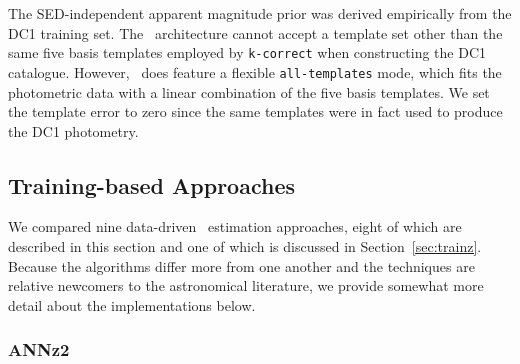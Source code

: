 The SED-independent apparent magnitude prior was derived empirically from the DC1 training set.
The \eazy\ architecture cannot accept a template set other than the same five basis templates employed by \texttt{k-correct} when constructing the DC1 catalogue.
However, \eazy\ does feature a flexible \texttt{all-templates} mode, which fits the photometric data with a linear combination of the five basis templates.
We set the template error to zero since the same templates were in fact used to produce the DC1 photometry.

\subsection{Training-based Approaches}
\label{sec:trainingcodes}

We compared nine data-driven \pz\ estimation approaches, eight of which are described in this section and one of which is discussed in Section~\ref{sec:trainz}.
Because the algorithms differ more from one another and the techniques are relative newcomers to the astronomical literature, we provide somewhat more detail about the implementations below.


\subsubsection{ANNz2}
\label{sec:annz2}

